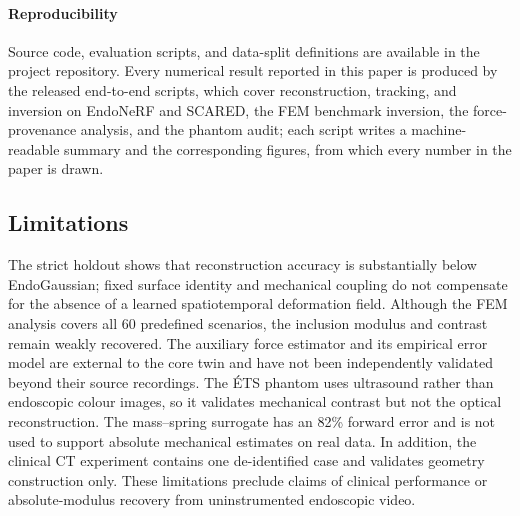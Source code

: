 \documentclass[smallextended]{svjour3}
\begin{document}
\paragraph{Reproducibility}\label{sec:repro}
Source code, evaluation scripts, and data-split definitions are available
in the project repository. Every numerical result
reported in this paper is produced by the released end-to-end scripts,
which cover reconstruction, tracking, and inversion on EndoNeRF and SCARED, the FEM
benchmark inversion, the force-provenance analysis, and the phantom audit;
each script writes a machine-readable summary and the corresponding
figures, from which every number in the paper is drawn.

\subsection{Limitations}
\label{sec:threats}
The strict holdout shows that reconstruction accuracy is substantially
below EndoGaussian; fixed surface identity and mechanical coupling do not
compensate for the absence of a learned spatiotemporal deformation field.
Although the FEM analysis covers all 60 predefined scenarios, the
inclusion modulus and contrast remain weakly recovered. The auxiliary
force estimator and its empirical error model are external to the core
twin and have not been independently validated beyond their source
recordings. The \'ETS phantom uses ultrasound rather than
endoscopic colour images, so it validates mechanical contrast but not the optical
reconstruction. The mass--spring surrogate has an 82\% forward error and is
not used to support absolute mechanical estimates on real data. In
addition, the clinical CT experiment contains one de-identified case and
validates geometry construction only. These limitations preclude claims of
clinical performance or absolute-modulus recovery from uninstrumented
endoscopic video.

\end{document}
